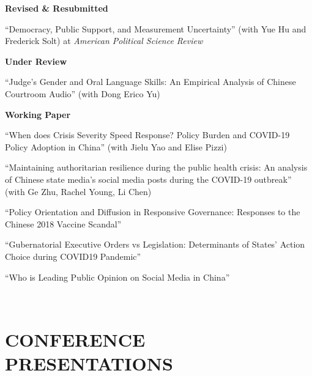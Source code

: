 \documentclass[10.5pt,]{article}
\providecommand{\tightlist}{%
	\setlength{\itemsep}{0pt}\setlength{\parskip}{0pt}}
\renewenvironment{itemize}{
	\begin{list}{}{
			\setlength{\leftmargin}{1.5em}
		}
	}{
	\end{list}
}
\begin{document}
 \begin{itemize}
 \tightlist
 \item
   \textbf{Revised \& Resubmitted}

   \begin{itemize}
   \tightlist
   \item
     ``Democracy, Public Support, and Measurement Uncertainty'' (with
     Yue Hu and Frederick Solt) at \emph{American Political Science
     Review}
   \end{itemize}
 \item
   \textbf{Under Review}

   \begin{itemize}
   \tightlist
   \item
     ``Judge's Gender and Oral Language Skills: An Empirical Analysis of
     Chinese Courtroom Audio'' (with Dong Erico Yu)
   \end{itemize}
 \item
   \textbf{Working Paper}

   \begin{itemize}
   \item
     ``When does Crisis Severity Speed Response? Policy Burden and
     COVID-19 Policy Adoption in China'' (with Jielu Yao and Elise
     Pizzi)
   \item
     ``Maintaining authoritarian resilience during the public health
     crisis: An analysis of Chinese state media's social media posts
     during the COVID-19 outbreak'' (with Ge Zhu, Rachel Young, Li Chen)
   \item
     ``Policy Orientation and Diffusion in Responsive Governance:
     Responses to the Chinese 2018 Vaccine Scandal''
   \item
     ``Gubernatorial Executive Orders vs Legislation: Determinants of
     States' Action Choice during COVID19 Pandemic''
   \item
     ``Who is Leading Public Opinion on Social Media in China''
   \end{itemize}
 \end{itemize}

 ~

 \hypertarget{conference-presentations}{%
 \section{CONFERENCE PRESENTATIONS}\label{conference-presentations}}
\end{document}

